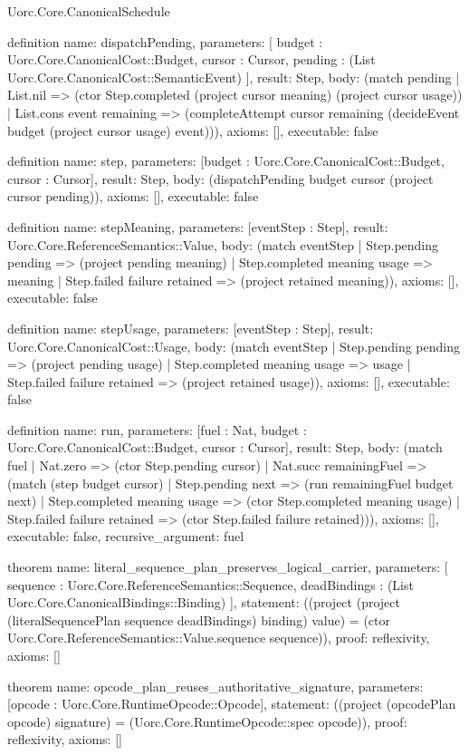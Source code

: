 \begin{lexlean}{Uorc.Core.CanonicalSchedule}
\begin{semanticmodule}
definition{
  name: dispatchPending,
  parameters: [
    budget : Uorc.Core.CanonicalCost::Budget,
    cursor : Cursor,
    pending : (List Uorc.Core.CanonicalCost::SemanticEvent)
  ],
  result: Step,
  body: (match pending
    | List.nil => (ctor Step.completed (project cursor meaning) (project cursor usage))
    | List.cons event remaining => (completeAttempt cursor remaining (decideEvent budget (project cursor usage) event))),
  axioms: [],
  executable: false
}

definition{
  name: step,
  parameters: [budget : Uorc.Core.CanonicalCost::Budget, cursor : Cursor],
  result: Step,
  body: (dispatchPending budget cursor (project cursor pending)),
  axioms: [],
  executable: false
}

definition{
  name: stepMeaning,
  parameters: [eventStep : Step],
  result: Uorc.Core.ReferenceSemantics::Value,
  body: (match eventStep
    | Step.pending pending => (project pending meaning)
    | Step.completed meaning usage => meaning
    | Step.failed failure retained => (project retained meaning)),
  axioms: [],
  executable: false
}

definition{
  name: stepUsage,
  parameters: [eventStep : Step],
  result: Uorc.Core.CanonicalCost::Usage,
  body: (match eventStep
    | Step.pending pending => (project pending usage)
    | Step.completed meaning usage => usage
    | Step.failed failure retained => (project retained usage)),
  axioms: [],
  executable: false
}

definition{
  name: run,
  parameters: [fuel : Nat, budget : Uorc.Core.CanonicalCost::Budget, cursor : Cursor],
  result: Step,
  body: (match fuel
    | Nat.zero => (ctor Step.pending cursor)
    | Nat.succ remainingFuel => (match (step budget cursor)
      | Step.pending next => (run remainingFuel budget next)
      | Step.completed meaning usage => (ctor Step.completed meaning usage)
      | Step.failed failure retained => (ctor Step.failed failure retained))),
  axioms: [],
  executable: false,
  recursive_argument: fuel
}

theorem{
  name: literal_sequence_plan_preserves_logical_carrier,
  parameters: [
    sequence : Uorc.Core.ReferenceSemantics::Sequence,
    deadBindings : (List Uorc.Core.CanonicalBindings::Binding)
  ],
  statement: ((project (project (literalSequencePlan sequence deadBindings) binding) value) = (ctor Uorc.Core.ReferenceSemantics::Value.sequence sequence)),
  proof: reflexivity{},
  axioms: []
}

theorem{
  name: opcode_plan_reuses_authoritative_signature,
  parameters: [opcode : Uorc.Core.RuntimeOpcode::Opcode],
  statement: ((project (opcodePlan opcode) signature) = (Uorc.Core.RuntimeOpcode::spec opcode)),
  proof: reflexivity{},
  axioms: []
}


\end{semanticmodule}
\end{lexlean}
